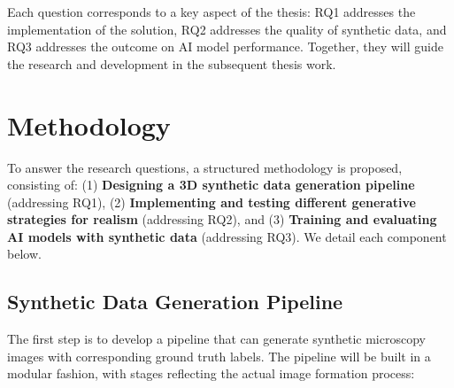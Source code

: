\documentclass[
oneside,      %
openany       %
]{imc-inf}
\begin{document}
	\vspace{1.5em} %
	Each question corresponds to a key aspect of the thesis: RQ1 addresses the implementation of the solution, RQ2 addresses the quality of synthetic data, and RQ3 addresses the outcome on AI model performance. Together, they will guide the research and development in the subsequent thesis work.
	
	
	
	\chapter{Methodology}\label{chap:methodology}
	To answer the research questions, a structured methodology is proposed, consisting of: (1) \textbf{Designing a 3D synthetic data generation pipeline} (addressing RQ1), (2) \textbf{Implementing and testing different generative strategies for realism} (addressing RQ2), and (3) \textbf{Training and evaluating AI models with synthetic data} (addressing RQ3). We detail each component below.
	
	\section{Synthetic Data Generation Pipeline}
	The first step is to develop a pipeline that can generate synthetic microscopy images with corresponding ground truth labels. The pipeline will be built in a modular fashion, with stages reflecting the actual image formation process:
	
\end{document}
